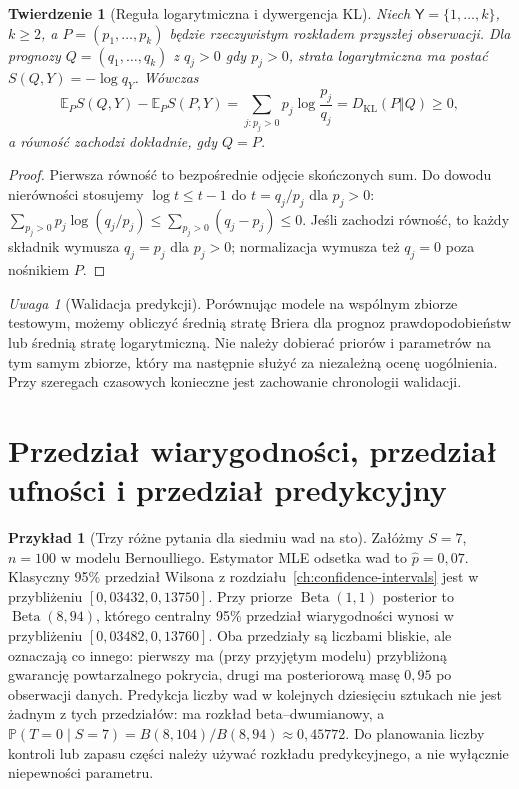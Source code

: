 \documentclass[11pt,a4paper,oneside]{report}
\numberwithin{equation}{chapter}
\theoremstyle{plain}
\newtheorem{twierdzenie}{Twierdzenie}[chapter]
\theoremstyle{definition}
\newtheorem{przyklad}{Przykład}[chapter]
\theoremstyle{remark}
\newtheorem{uwaga}{Uwaga}[chapter]
\newcommand{\Prob}{\mathbb P}
\newcommand{\E}{\mathbb E}
\begin{document}
\begin{twierdzenie}[Reguła logarytmiczna i dywergencja KL]
\label{thm:log-score-bayes}
Niech $\mathsf Y=\{1,\ldots,k\}$, $k\ge2$, a
$P=(p_1,\ldots,p_k)$ będzie rzeczywistym rozkładem przyszłej
obserwacji. Dla prognozy $Q=(q_1,\ldots,q_k)$ z $q_j>0$
gdy $p_j>0$, strata logarytmiczna ma postać
$S(Q,Y)=-\log q_Y$. Wówczas
\[
\E_P S(Q,Y)-\E_P S(P,Y)
=\sum_{j:p_j>0}p_j\log\frac{p_j}{q_j}
= D_{\mathrm{KL}}(P\Vert Q)\ge0,
\]
a równość zachodzi dokładnie, gdy $Q=P$.
\end{twierdzenie}
\begin{proof}
Pierwsza równość to bezpośrednie odjęcie skończonych sum.
Do dowodu nierówności stosujemy $\log t\le t-1$ do
$t=q_j/p_j$ dla $p_j>0$:
$\sum_{p_j>0}p_j\log(q_j/p_j)
\le\sum_{p_j>0}(q_j-p_j)\le0$.
Jeśli zachodzi równość, to każdy składnik wymusza
$q_j=p_j$ dla $p_j>0$; normalizacja wymusza też
$q_j=0$ poza nośnikiem $P$.
\end{proof}

\begin{uwaga}[Walidacja predykcji]
Porównując modele na wspólnym zbiorze testowym, możemy
obliczyć średnią stratę Briera dla prognoz prawdopodobieństw
lub średnią stratę logarytmiczną. Nie należy dobierać priorów
i parametrów na tym samym zbiorze, który ma następnie służyć
za niezależną ocenę uogólnienia. Przy szeregach czasowych
konieczne jest zachowanie chronologii walidacji.
\end{uwaga}

\section{Przedział wiarygodności, przedział ufności i przedział predykcyjny}
\begin{przyklad}[Trzy różne pytania dla siedmiu wad na sto]
Załóżmy $S=7$, $n=100$ w modelu Bernoulliego. Estymator MLE
odsetka wad to $\widehat p=0{,}07$. Klasyczny 95\% przedział
Wilsona z rozdziału~\ref{ch:confidence-intervals} jest w przybliżeniu
$[0{,}03432,0{,}13750]$. Przy priorze
$\operatorname{Beta}(1,1)$ posterior to
$\operatorname{Beta}(8,94)$, którego centralny 95\%
przedział wiarygodności wynosi w przybliżeniu
$[0{,}03482,0{,}13760]$.
Oba przedziały są liczbami bliskie, ale oznaczają co innego:
pierwszy ma (przy przyjętym modelu) przybliżoną gwarancję
powtarzalnego pokrycia, drugi ma posteriorową masę $0{,}95$
po obserwacji danych. Predykcja liczby wad w kolejnych
dziesięciu sztukach nie jest żadnym z tych przedziałów:
ma rozkład beta--dwumianowy, a
$\Prob(T=0\mid S=7)=B(8,104)/B(8,94)\approx0{,}45772$.
Do planowania liczby kontroli lub zapasu części należy używać
rozkładu predykcyjnego, a nie wyłącznie niepewności parametru.
\end{przyklad}
\end{document}
